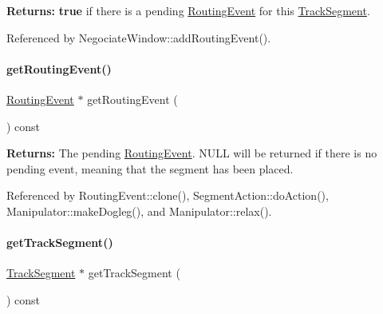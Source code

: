{\bfseries Returns\+:} {\bfseries true} if there is a pending \hyperlink{classKite_1_1RoutingEvent}{Routing\+Event} for this \hyperlink{classKite_1_1TrackSegment}{Track\+Segment}. 

Referenced by Negociate\+Window\+::add\+Routing\+Event().

\mbox{\label{classKite_1_1DataNegociate_a831dab8eb708da17b4f1e1a8c057f283}} 
\paragraph{\texorpdfstring{get\+Routing\+Event()}{getRoutingEvent()}}
{\footnotesize\ttfamily \hyperlink{classKite_1_1RoutingEvent}{Routing\+Event} $\ast$ get\+Routing\+Event (\begin{DoxyParamCaption}{ }\end{DoxyParamCaption}) const\hspace{0.3cm}{\ttfamily [inline]}}

{\bfseries Returns\+:} The pending \hyperlink{classKite_1_1RoutingEvent}{Routing\+Event}. {\ttfamily N\+U\+LL} will be returned if there is no pending event, meaning that the segment has been placed. 

Referenced by Routing\+Event\+::clone(), Segment\+Action\+::do\+Action(), Manipulator\+::make\+Dogleg(), and Manipulator\+::relax().

\mbox{\label{classKite_1_1DataNegociate_abc97e384245eab238831f9461968025b}} 
\paragraph{\texorpdfstring{get\+Track\+Segment()}{getTrackSegment()}}
{\footnotesize\ttfamily \hyperlink{classKite_1_1TrackSegment}{Track\+Segment} $\ast$ get\+Track\+Segment (\begin{DoxyParamCaption}{ }\end{DoxyParamCaption}) const\hspace{0.3cm}{\ttfamily [inline]}}

